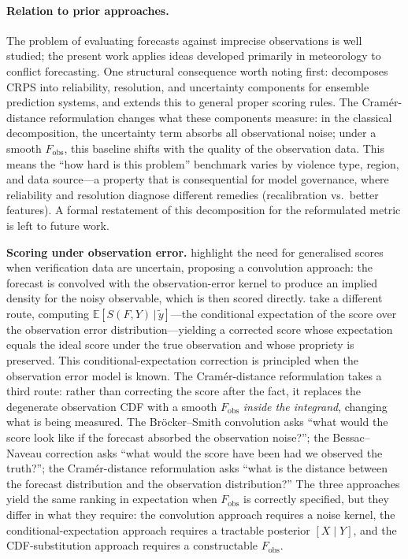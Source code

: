 \paragraph{Relation to prior approaches.}
The problem of evaluating forecasts against imprecise observations is well studied; the present work applies ideas developed primarily in meteorology to conflict forecasting. One structural consequence worth noting first: \citet{hersbach2000decomposition} decomposes CRPS into reliability, resolution, and uncertainty components for ensemble prediction systems, and \citet{brocker2009reliability} extends this to general proper scoring rules. The Cram\'er-distance reformulation changes what these components measure: in the classical decomposition, the uncertainty term absorbs all observational noise; under a smooth $F_\text{obs}$, this baseline shifts with the quality of the observation data. This means the ``how hard is this problem'' benchmark varies by violence type, region, and data source---a property that is consequential for model governance, where reliability and resolution diagnose different remedies (recalibration vs.\ better features). A formal restatement of this decomposition for the reformulated metric is left to future work.

\textbf{Scoring under observation error.} \citet{brocker2007scoring} highlight the need for generalised scores when verification data are uncertain, proposing a convolution approach: the forecast is convolved with the observation-error kernel to produce an implied density for the noisy observable, which is then scored directly. \citet{bessac2021forecast} take a different route, computing $\mathbb{E}[S(F, Y) \,|\, \tilde{y}]$---the conditional expectation of the score over the observation error distribution---yielding a corrected score whose expectation equals the ideal score under the true observation and whose propriety is preserved. This conditional-expectation correction is principled when the observation error model is known. The Cram\'er-distance reformulation takes a third route: rather than correcting the score after the fact, it replaces the degenerate observation CDF with a smooth $F_\text{obs}$ \emph{inside the integrand}, changing what is being measured. The Br\"ocker--Smith convolution asks ``what would the score look like if the forecast absorbed the observation noise?''; the Bessac--Naveau correction asks ``what would the score have been had we observed the truth?''; the Cram\'er-distance reformulation asks ``what is the distance between the forecast distribution and the observation distribution?'' The three approaches yield the same ranking in expectation when $F_\text{obs}$ is correctly specified, but they differ in what they require: the convolution approach requires a noise kernel, the conditional-expectation approach requires a tractable posterior $[X \mid Y]$, and the CDF-substitution approach requires a constructable $F_\text{obs}$.

